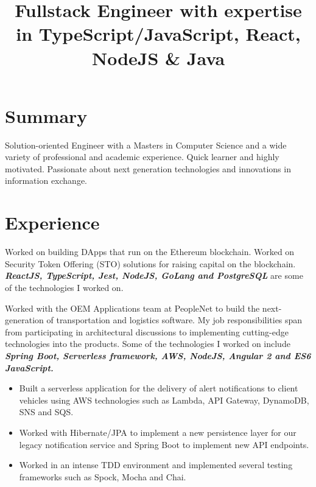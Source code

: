 \documentclass[12pt,a4paper,sans]{moderncv}
\title{Fullstack Engineer with expertise in TypeScript/JavaScript, React, NodeJS \& Java}
\begin{document}
\maketitle
\vspace{-1cm}
\section{Summary}
{Solution-oriented Engineer with a Masters in Computer Science and a wide variety of professional and academic experience. Quick learner and highly motivated. Passionate about next generation technologies and innovations in information exchange. }
\vspace{0.1cm}
\section{Experience}
{
Worked on building DApps that run on the Ethereum blockchain. Worked on Security Token Offering (STO) solutions for raising capital on the blockchain.\textbf{\emph{ ReactJS, TypeScript, Jest, NodeJS, GoLang and PostgreSQL}} are some of the technologies I worked on.
}
\vspace{0.3cm}
{
Worked with the OEM Applications team at PeopleNet to build the next-generation of transportation and logistics software. My job responsibilities span from participating in architectural discussions to implementing cutting-edge technologies into the products. Some of the technologies I worked on include \textbf{\emph{Spring Boot, Serverless framework, AWS, NodeJS, Angular 2 and ES6 JavaScript.}}
\begin{itemize}
\item Built a serverless application for the delivery of alert notifications to client vehicles using AWS technologies such as Lambda, API Gateway, DynamoDB, SNS and SQS.
\item Worked with Hibernate/JPA to implement a new persistence layer for our legacy notification service and Spring Boot to implement new API endpoints.
\item Worked in an intense TDD environment and implemented several testing frameworks such as Spock, Mocha and Chai.
\end{itemize}
}
\end{document}
